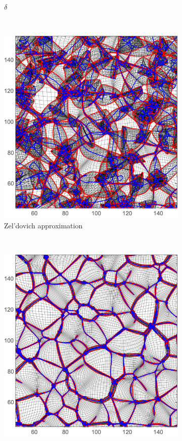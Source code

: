 \documentclass[a4paper, 11pt]{article}
\begin{document}
\begin{figure}
\begin{subfigure}[b]{0.49\textwidth}
\caption{$\delta$}
\end{subfigure}\\[0.5cm]
\begin{subfigure}[b]{0.49\textwidth}
\includegraphics[width=\textwidth]{Eulerian_Z}
\caption{Zel'dovich approximation}
\end{subfigure}~
\begin{subfigure}[b]{0.49\textwidth}
\includegraphics[width=\textwidth]{Eulerian_Nb}

\end{subfigure}
\end{figure}
\end{document}
